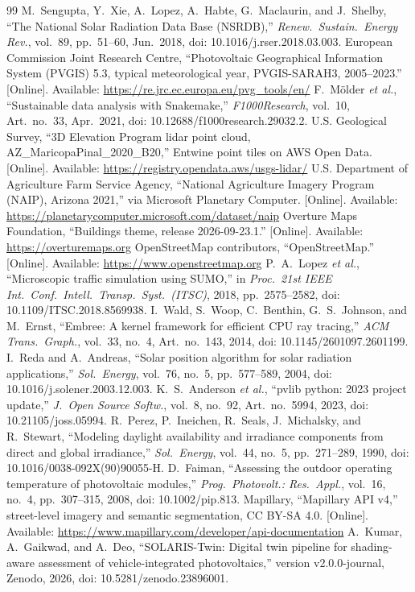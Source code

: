 \documentclass[lettersize,journal]{IEEEtran}
\begin{document}
\begin{thebibliography}{99}
 M.~Sengupta, Y.~Xie, A.~Lopez, A.~Habte, G.~Maclaurin, and J.~Shelby, ``The National Solar Radiation Data Base (NSRDB),'' \emph{Renew.\ Sustain.\ Energy Rev.}, vol.~89, pp.~51--60, Jun.\ 2018, doi: 10.1016/j.rser.2018.03.003.
 European Commission Joint Research Centre, ``Photovoltaic Geographical Information System (PVGIS) 5.3, typical meteorological year, PVGIS-SARAH3, 2005--2023.'' [Online]. Available: \url{https://re.jrc.ec.europa.eu/pvg_tools/en/}
 F.~M\"older \emph{et al.}, ``Sustainable data analysis with Snakemake,'' \emph{F1000Research}, vol.~10, Art.~no.~33, Apr.\ 2021, doi: 10.12688/f1000research.29032.2.
 U.S. Geological Survey, ``3D Elevation Program lidar point cloud, AZ\_MaricopaPinal\_2020\_B20,'' Entwine point tiles on AWS Open Data. [Online]. Available: \url{https://registry.opendata.aws/usgs-lidar/}
 U.S. Department of Agriculture Farm Service Agency, ``National Agriculture Imagery Program (NAIP), Arizona 2021,'' via Microsoft Planetary Computer. [Online]. Available: \url{https://planetarycomputer.microsoft.com/dataset/naip}
 Overture Maps Foundation, ``Buildings theme, release 2026-09-23.1.'' [Online]. Available: \url{https://overturemaps.org}
 OpenStreetMap contributors, ``OpenStreetMap.'' [Online]. Available: \url{https://www.openstreetmap.org}
 P.~A.~Lopez \emph{et al.}, ``Microscopic traffic simulation using SUMO,'' in \emph{Proc.\ 21st IEEE Int.\ Conf.\ Intell.\ Transp.\ Syst.\ (ITSC)}, 2018, pp.~2575--2582, doi: 10.1109/ITSC.2018.8569938.
 I.~Wald, S.~Woop, C.~Benthin, G.~S.~Johnson, and M.~Ernst, ``Embree: A kernel framework for efficient CPU ray tracing,'' \emph{ACM Trans.\ Graph.}, vol.~33, no.~4, Art.~no.~143, 2014, doi: 10.1145/2601097.2601199.
 I.~Reda and A.~Andreas, ``Solar position algorithm for solar radiation applications,'' \emph{Sol.\ Energy}, vol.~76, no.~5, pp.~577--589, 2004, doi: 10.1016/j.solener.2003.12.003.
 K.~S.~Anderson \emph{et al.}, ``pvlib python: 2023 project update,'' \emph{J.\ Open Source Softw.}, vol.~8, no.~92, Art.~no.~5994, 2023, doi: 10.21105/joss.05994.
 R.~Perez, P.~Ineichen, R.~Seals, J.~Michalsky, and R.~Stewart, ``Modeling daylight availability and irradiance components from direct and global irradiance,'' \emph{Sol.\ Energy}, vol.~44, no.~5, pp.~271--289, 1990, doi: 10.1016/0038-092X(90)90055-H.
 D.~Faiman, ``Assessing the outdoor operating temperature of photovoltaic modules,'' \emph{Prog.\ Photovolt.: Res.\ Appl.}, vol.~16, no.~4, pp.~307--315, 2008, doi: 10.1002/pip.813.
 Mapillary, ``Mapillary API v4,'' street-level imagery and semantic segmentation, CC BY-SA 4.0. [Online]. Available: \url{https://www.mapillary.com/developer/api-documentation}
 A.~Kumar, A.~Gaikwad, and A.~Deo, ``SOLARIS-Twin: Digital twin pipeline for shading-aware assessment of vehicle-integrated photovoltaics,'' version v2.0.0-journal, Zenodo, 2026, doi: 10.5281/zenodo.23896001.
\end{thebibliography}
\end{document}
